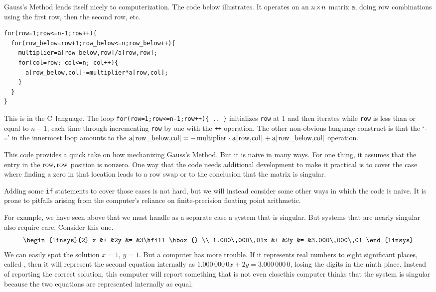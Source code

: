 Gauss's Method lends itself nicely to computerization.
The code below illustrates.
It operates on an $n \! \times \! n$ matrix \texttt{a}, 
doing row combinations using the first row, then
the second row, etc.
\begin{lstlisting}
for(row=1;row<=n-1;row++){
  for(row_below=row+1;row_below<=n;row_below++){
    multiplier=a[row_below,row]/a[row,row];
    for(col=row; col<=n; col++){
      a[row_below,col]-=multiplier*a[row,col];
    }
  }
}
\end{lstlisting}
This is in the C~language.
The loop 
\lstinline!for(row=1;row<=n-1;row++){ .. }!
initializes \texttt{row} at $1$ and then iterates while
\texttt{row} is less than or equal to $n-1$, each time through
incrementing \lstinline!row! by one with the 
\lstinline!++! operation.
The other non-obvious language 
construct is that the `\texttt{-=}' in the innermost
loop amounts to the
$\text{\lstinline!a[row\_below,col]!}=
           -\text{\lstinline!multiplier!}\cdot\text{\lstinline!a[row,col]!}
           +\text{\lstinline!a[row\_below,col]!}$
operation.

This code provides a quick take on how mechanizing Gauss's Method.
But it is naive in many ways.
For one thing, it assumes that 
the entry in the
$\text{\lstinline!row!},\text{\lstinline!row!}$ position is nonzero.
One way that the code needs additional development to make it practical
is to cover
the case where finding a zero in that location leads to a row swap or to the
conclusion that the matrix is singular.

Adding some \lstinline!if! statements to cover those cases is not hard,
but we will instead consider some other ways in which the code is naive.
It is prone to pitfalls arising from the computer's reliance on 
finite-precision floating point arithmetic.

For example, we have seen above that we must handle as a separate case a
system that is singular.
But systems that are nearly singular also require care.
Consider this one.
\begin{equation*}
   \begin{linsys}{2}
                   x &+ &2y &= &3\hfill\hbox{}  \\
     1.000\,000\,01x &+ &2y &= &3.000\,000\,01
   \end{linsys}
\end{equation*}
We can easily spot the solution $x=1$, $y=1$.
But a computer has more trouble.
If it represents real numbers to eight significant places, called 
, 
then it will represent the second
equation internally as $1.000\,000\,0x+2y=3.000\,000\,0$, losing the
digits in the ninth place.
Instead of reporting the correct solution, this computer will report something
that is not even close\Dash this computer thinks that the system is singular
because the two equations are represented internally as equal.

